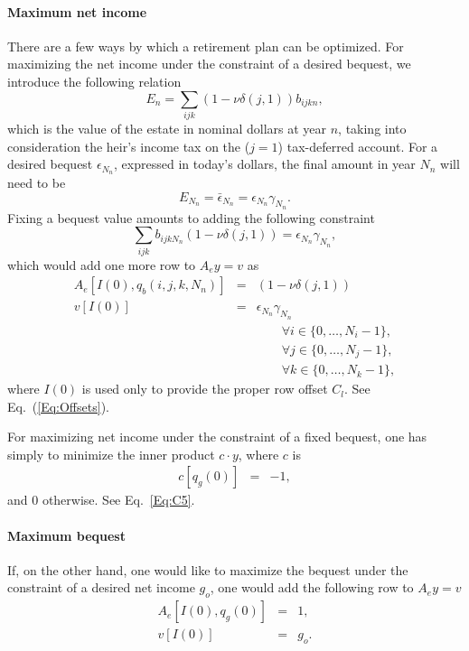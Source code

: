 \documentclass{article}[fleqn,12pt]
\begin{document}
\paragraph*{Maximum net income}
There are a few ways by which a retirement plan can be optimized. For maximizing the net income under the constraint of
a desired bequest, we introduce the following relation
\begin{equation}
	\label{Eq:Bequest}
	E_n = \sum_{ijk} (1 - \nu\delta(j, 1)) b_{ijkn},
\end{equation}
which is the value of the estate in nominal dollars at year $n$,
taking into consideration the heir's income tax on the ($j=1$) tax-deferred account. 
For a desired bequest $\epsilon_{N_n}$, expressed in today's
dollars, the final amount in year $N_n$ will need to be
\begin{equation}
	E_{N_n} = \bar\epsilon_{N_n} = \epsilon_{N_n} \gamma_{N_n}.
\end{equation}
Fixing a bequest value amounts to adding the following constraint
\begin{equation}
	\sum_{ijk} b_{ijkN_n} (1 - \nu\delta(j, 1)) = \epsilon_{N_n} \gamma_{N_n},
\end{equation}
which would add one more row to $A_ey = v$ as
\begin{eqnarray}
	A_e[I(0), q_b(i, j, k, N_n)] &=& (1 - \nu\delta(j, 1)) \nonumber \\
	v[I(0)] &=& \epsilon_{N_n}\gamma_{N_n} \\
	&&\qquad\forall i \in \{0,\ldots, N_i-1\},\nonumber\\
	&&\qquad\forall j \in \{0,\ldots, N_j-1\},\nonumber\\
	&&\qquad\forall k \in \{0,\ldots, N_k-1\},\nonumber
\end{eqnarray}
where $I(0)$ is used only to provide the proper row offset $C_l$. See Eq.~(\ref{Eq:Offsets}).

For maximizing net income under the constraint of a fixed bequest, one has simply to
minimize the inner product $c\cdot y$, where $c$ is
\begin{eqnarray}
	c[q_g(0)] &=& -1,
\end{eqnarray}
and 0 otherwise. See Eq.~\ref{Eq:C5}.

\paragraph*{Maximum bequest}
If, on the other hand, one would like to maximize the bequest under the constraint of a desired net income $g_o$,
one would add the following row to $A_ey = v$
\begin{eqnarray}
	\label{Eq:FixedIncome}
	A_e[I(0), q_g(0)] &=& 1, \nonumber \\
	v[I(0)] &=& g_o.
\end{eqnarray}
\end{document}
